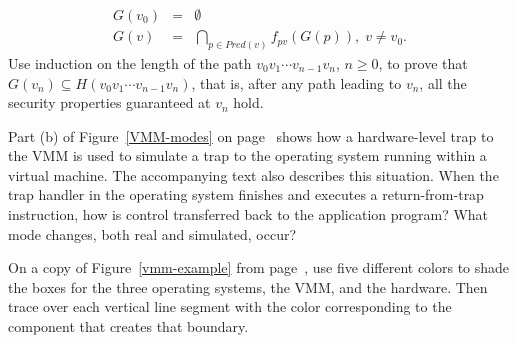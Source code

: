 \begin{chapterEnumerate}
\begin{eqnarray*}
G(v_0) &=& \emptyset\\
G(v) &=& \bigcap_{p \in Pred(v)} f_{pv}(G(p)),\; v \neq v_0.
\end{eqnarray*}
Use induction on the length of the path $v_0v_1\cdots v_{n-1}v_n$,
$n \geq 0$, to prove that $G(v_n) \subseteq H(v_0v_1\cdots
v_{n-1}v_n)$, that is, after any path leading to $v_n$, all the security
properties guaranteed at $v_n$ hold.
\item\label{VM-trap-return-exercise}
Part (b) of Figure~\ref{VMM-modes} on page~\pageref{VMM-modes} shows
how a hardware-level trap to the VMM is used to simulate a trap to the
operating system running within a virtual machine.  The accompanying
text also describes this situation.  When the trap
handler in the operating system finishes and executes a
return-from-trap instruction, how is control transferred back to the
application program?  What mode changes, both real and simulated, occur?
\item
On a copy of Figure~\ref{vmm-example} from page~\pageref{vmm-example}, use five different colors to shade the boxes for the three operating systems, the VMM, and the hardware.  Then trace over each vertical line segment with the color corresponding to the component that creates that boundary.
\end{chapterEnumerate}

